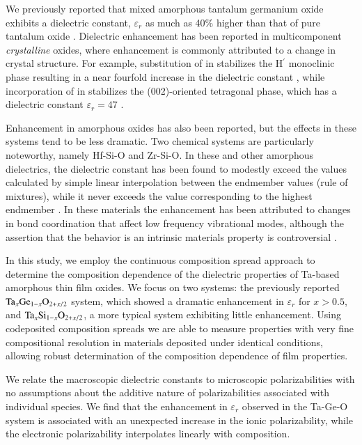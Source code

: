 We previously reported that mixed amorphous tantalum germanium oxide exhibits a dielectric constant, $\varepsilon_{r}$ as much as 40\% higher than that of pure tantalum oxide \cite{Naoi2012}. Dielectric enhancement has been reported in multicomponent \textit{crystalline} oxides, where enhancement is commonly attributed to a change in crystal structure. For example, substitution of  in  stabilizes the H$^{\prime}$ monoclinic phase resulting in a near fourfold increase in the dielectric constant \cite{Cava1995}, while incorporation of  in  stabilizes the (002)-oriented tetragonal phase, which has a dielectric constant $\varepsilon_{r} =47$ \cite{Park2006}.

Enhancement in amorphous oxides has also been reported, but the effects in these systems tend to be less dramatic. Two chemical systems are particularly noteworthy, namely Hf-Si-O and Zr-Si-O. In these and other amorphous dielectrics, the dielectric constant has been found to modestly exceed the values calculated by simple linear interpolation  between the endmember values (rule of mixtures), while it never exceeds the value corresponding to the highest endmember \cite{Wilk2000a}. In these materials the enhancement has been attributed to changes in bond coordination that affect low frequency vibrational modes, although the assertion that the behavior is an intrinsic materials property is controversial \cite{Lucovsky2000, Rignanese2002, Pignedoli2007}.

In this study, we employ the continuous composition spread approach to determine the composition dependence of the dielectric properties of Ta-based amorphous thin film oxides. We focus on two systems: the previously reported $\textnormal{Ta}_{x}\textnormal{Ge}_{1-x}\textnormal{O}_{2+x/2}$ system, which showed a dramatic enhancement in $\varepsilon_{r}$ for $x > 0.5$, and  $\textnormal{Ta}_{x}\textnormal{Si}_{1-x}\textnormal{O}_{2+x/2}$, a more typical system exhibiting little enhancement. Using codeposited composition spreads \cite{VanDover2004a} we are able to measure properties with very fine compositional resolution in materials deposited under identical conditions, allowing robust determination of the composition dependence of film properties. 

We relate the macroscopic dielectric constants to microscopic polarizabilities with no assumptions about the additive nature of polarizabilities associated with individual species. We find that the enhancement in $\varepsilon_{r}$ observed in the Ta-Ge-O system is associated with an unexpected increase in the ionic polarizability, while the electronic polarizability interpolates linearly with composition.  

